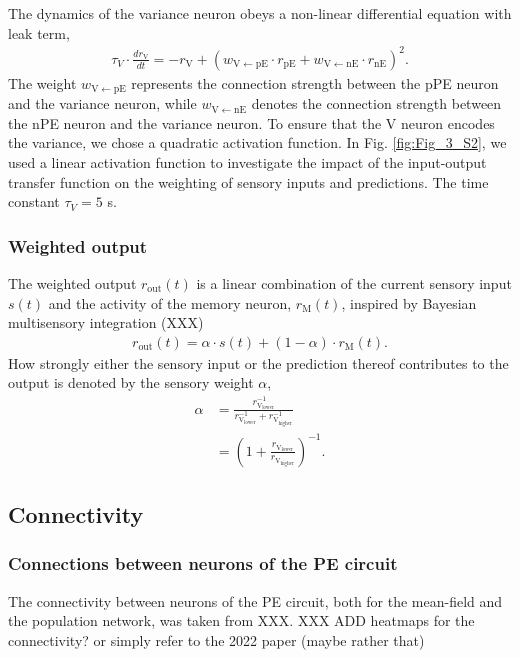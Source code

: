 \documentclass[10pt,a4paper,draft]{article}
\begin{document}
The dynamics of the variance neuron obeys a non-linear differential equation with leak term,
%
\begin{align}
\tau_V \cdot \frac{dr_\mathrm{V}}{dt} = -r_\mathrm{V} + (w_\mathrm{V\leftarrow pE} \cdot r_\mathrm{pE} + w_\mathrm{V\leftarrow nE} \cdot r_\mathrm{nE})^2.
\end{align}
%
The weight $w_\mathrm{V\leftarrow pE}$ represents the connection strength between the pPE neuron and the variance neuron, while  $w_\mathrm{V\leftarrow nE}$ denotes the connection strength between the nPE neuron and the variance neuron. To ensure that the V neuron encodes the variance, we chose a quadratic activation function. In Fig. \ref{fig:Fig_3_S2}, we used a linear activation function to investigate the impact of the input-output transfer function on the weighting of sensory inputs and predictions. The time constant $\tau_V = 5$ s.

\subsubsection{Weighted output}
%
The weighted output $r_\mathrm{out}(t) $ is a linear combination of the current sensory input $s(t)$ and the activity of the memory neuron, $r_\mathrm{M}(t)$, inspired by Bayesian multisensory integration (XXX)
%
\begin{align}
r_\mathrm{out}(t) = \alpha \cdot s(t) + (1-\alpha) \cdot r_\mathrm{M}(t).
\end{align}
%
How strongly either the sensory input or the prediction thereof contributes to the output is denoted by the sensory weight $\alpha$,
%
\begin{align}
\alpha &= \frac{r_\mathrm{V_{lower}}^{-1}}{r_\mathrm{V_{lower}}^{-1} + r_\mathrm{V_{higher}}^{-1}}\nonumber\\
& = \left( 1 + \frac{r_\mathrm{V_{lower}}}{r_\mathrm{V_{higher}}} \right)^{-1}.
\end{align}

\subsection{Connectivity}
%
%
\subsubsection{Connections between neurons of the PE circuit}
%
The connectivity between neurons of the PE circuit, both for the mean-field and the population network, was taken from XXX. XXX ADD heatmaps for the connectivity? or simply refer to the 2022 paper (maybe rather that)
\end{document}
